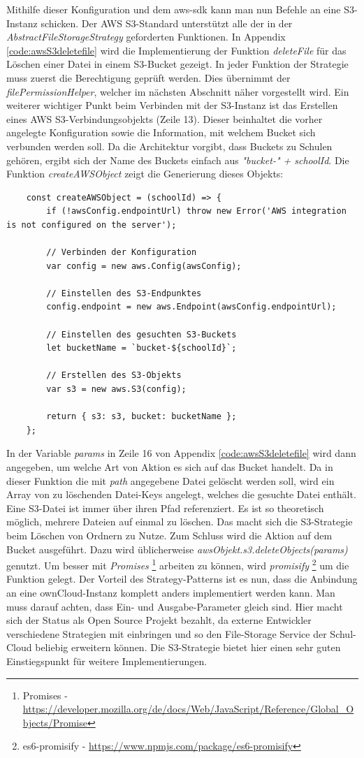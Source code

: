 Mithilfe dieser Konfiguration und dem aws-sdk kann man nun Befehle an eine S3-Instanz schicken. Der AWS S3-Standard unterstützt alle der in der \textit{AbstractFileStorageStrategy} geforderten Funktionen. In Appendix \ref{code:awsS3deletefile} wird die Implementierung der Funktion \textit{deleteFile} für das Löschen einer Datei in einem S3-Bucket gezeigt. In jeder Funktion der Strategie muss zuerst die Berechtigung geprüft werden. Dies übernimmt der \textit{filePermissionHelper}, welcher im nächsten Abschnitt näher vorgestellt wird. Ein weiterer wichtiger Punkt beim Verbinden mit der S3-Instanz ist das Erstellen eines AWS S3-Verbindungsobjekts (Zeile 13). Dieser beinhaltet die vorher angelegte Konfiguration sowie die Information, mit welchem Bucket sich verbunden werden soll. Da die Architektur vorgibt, dass Buckets zu Schulen gehören, ergibt sich der Name des Buckets einfach aus \textit{"bucket-" + schoolId}. Die Funktion \textit{createAWSObject} zeigt die Generierung dieses Objekts:

\begin{lstlisting}
	const createAWSObject = (schoolId) => {
		if (!awsConfig.endpointUrl) throw new Error('AWS integration is not configured on the server');
		
		// Verbinden der Konfiguration
		var config = new aws.Config(awsConfig);
		
		// Einstellen des S3-Endpunktes
		config.endpoint = new aws.Endpoint(awsConfig.endpointUrl);
		
		// Einstellen des gesuchten S3-Buckets
		let bucketName = `bucket-${schoolId}`;
		
		// Erstellen des S3-Objekts
		var s3 = new aws.S3(config);
		
		return { s3: s3, bucket: bucketName };
	};
\end{lstlisting}

In der Variable \textit{params} in Zeile 16 von Appendix \ref{code:awsS3deletefile} wird dann angegeben, um welche Art von Aktion es sich auf das Bucket handelt. Da in dieser Funktion die mit \textit{path} angegebene Datei gelöscht werden soll, wird ein Array von zu löschenden Datei-Keys angelegt, welches die gesuchte Datei enthält. Eine S3-Datei ist immer über ihren Pfad referenziert. Es ist so theoretisch möglich, mehrere Dateien auf einmal zu löschen. Das macht sich die S3-Strategie beim Löschen von Ordnern zu Nutze. Zum Schluss wird die Aktion auf dem Bucket ausgeführt. Dazu wird üblicherweise \textit{awsObjekt.s3.deleteObjects(params)} genutzt. Um besser mit \textit{Promises} \footnote{Promises - \url{https://developer.mozilla.org/de/docs/Web/JavaScript/Reference/Global_Objects/Promise}} arbeiten zu können, wird \textit{promisify} \footnote{es6-promisify - \url{https://www.npmjs.com/package/es6-promisify}} um die Funktion gelegt. Der Vorteil des Strategy-Patterns ist es nun, dass die Anbindung an eine ownCloud-Instanz komplett anders implementiert werden kann. Man muss darauf achten, dass Ein- und Ausgabe-Parameter gleich sind. Hier macht sich der Status als Open Source Projekt bezahlt, da externe Entwickler verschiedene Strategien mit einbringen und so den File-Storage Service der Schul-Cloud beliebig erweitern können. Die S3-Strategie bietet hier einen sehr guten Einstiegspunkt für weitere Implementierungen.

